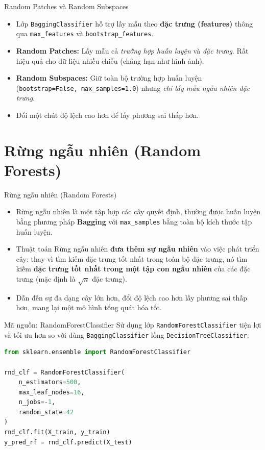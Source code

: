 \documentclass[aspectratio=169]{beamer}
\begin{document}
\begin{frame}{Random Patches và Random Subspaces}
    \begin{itemize}
        \item Lớp \texttt{BaggingClassifier} hỗ trợ lấy mẫu theo \textbf{đặc trưng (features)} thông qua \texttt{max\_features} và \texttt{bootstrap\_features}.
        \item \textbf{Random Patches:} Lấy mẫu cả \textit{trường hợp huấn luyện} và \textit{đặc trưng}. Rất hiệu quả cho dữ liệu nhiều chiều (chẳng hạn như hình ảnh).
        \item \textbf{Random Subspaces:} Giữ toàn bộ trường hợp huấn luyện (\texttt{bootstrap=False, max\_samples=1.0}) nhưng \textit{chỉ lấy mẫu ngẫu nhiên đặc trưng}.
        \item Đổi một chút độ lệch cao hơn để lấy phương sai thấp hơn.
    \end{itemize}
\end{frame}

\section{Rừng ngẫu nhiên (Random Forests)}
\begin{frame}{Rừng ngẫu nhiên (Random Forests)}
    \begin{itemize}
        \item Rừng ngẫu nhiên là một tập hợp các cây quyết định, thường được huấn luyện bằng phương pháp \textbf{Bagging} với \texttt{max\_samples} bằng toàn bộ kích thước tập huấn luyện.
        \item Thuật toán Rừng ngẫu nhiên \textbf{đưa thêm sự ngẫu nhiên} vào việc phát triển cây: thay vì tìm kiếm đặc trưng tốt nhất trong toàn bộ đặc trưng, nó tìm kiếm \textbf{đặc trưng tốt nhất trong một tập con ngẫu nhiên} của các đặc trưng (mặc định là $\sqrt{n}$ đặc trưng).
        \item Dẫn đến sự đa dạng cây lớn hơn, đổi độ lệch cao hơn lấy phương sai thấp hơn, mang lại một mô hình tổng quát hóa tốt.
    \end{itemize}
\end{frame}

\begin{frame}[fragile]{Mã nguồn: RandomForestClassifier}
    Sử dụng lớp \texttt{RandomForestClassifier} tiện lợi và tối ưu hơn so với dùng \texttt{BaggingClassifier} lồng \texttt{DecisionTreeClassifier}:
    \begin{lstlisting}[language=Python]
from sklearn.ensemble import RandomForestClassifier

rnd_clf = RandomForestClassifier(
    n_estimators=500,
    max_leaf_nodes=16,
    n_jobs=-1,
    random_state=42
)
rnd_clf.fit(X_train, y_train)
y_pred_rf = rnd_clf.predict(X_test)
    \end{lstlisting}
\end{frame}
\end{document}

